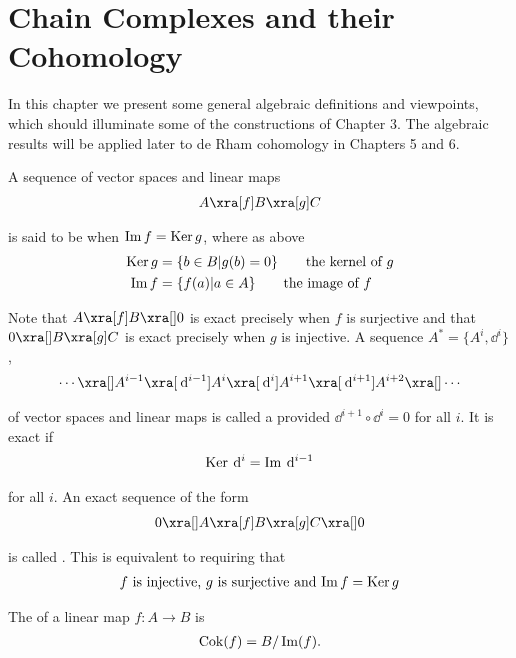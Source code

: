 \chapter{Chain Complexes and their Cohomology}
In this chapter we present some general algebraic definitions and viewpoints,
which should illuminate some of the constructions of Chapter 3. The algebraic
results will be applied later to de Rham cohomology in Chapters 5 and 6.

A sequence of vector spaces and linear maps
\begin{align}\label{eq:4-1}
  A \xra[f] B \xra[g] C
\end{align}

is said to be  when $\operatorname{Im} f = \operatorname{Ker} g$, where as above
\begin{align*}
  \operatorname{Ker} g & = \{b\in B | g(b) = 0\}\qquad \text{the kernel of } g \\
  \operatorname{Im} f  & = \{f(a) | a\in A\}\qquad \text{the image of } f
\end{align*}

Note that $A\xra[f]B\xra[]0$ is exact precisely when $f$ is surjective and that $0\xra[]B\xra[g]C$ is exact
precisely when $g$ is injective. A sequence $A^* = \{A^i, \dd^i\}$,
\begin{align}\label{eq:4-2}
  \cdots \xra[] A^{i-1}\xra[\dd^{i-1}] A^i \xra[\dd^i] A^{i+1} \xra[\dd^{i+1}] A^{i+2}\xra[]\cdots
\end{align}

of vector spaces and linear maps is called a  provided $\dd^{i+1}\circ\dd^i = 0$
for all $i$. It is exact if
\begin{align*}
  \ker \dd^i = \im \dd^{i-1}
\end{align*}

for all $i$. An exact sequence of the form
\begin{align}\label{eq:4-3}
  0\xra[]A\xra[f]B\xra[g]C\xra[]0
\end{align}

is called . This is equivalent to requiring that
\begin{align*}
  \text{$f$ is injective, $g$ is surjective and $\operatorname{Im} f = \operatorname{Ker} g$}
\end{align*}

The  of a linear map $f:A\to B$ is
\begin{align*}
  \operatorname{Cok}(f) = B/\operatorname{Im}(f).
\end{align*}

